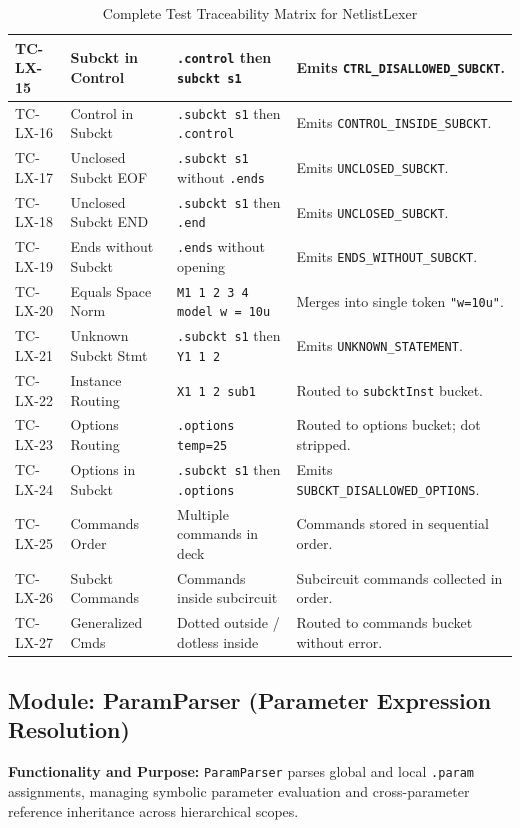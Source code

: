\begin{table}[H]
\begin{tabular}{|l|l|p{4.5cm}|p{4.5cm}|}
\hline
TC-LX-15 & Subckt in Control & \texttt{.control} then \texttt{subckt s1} & Emits \texttt{CTRL\_DISALLOWED\_SUBCKT}. \\
\hline
TC-LX-16 & Control in Subckt & \texttt{.subckt s1} then \texttt{.control} & Emits \texttt{CONTROL\_INSIDE\_SUBCKT}. \\
\hline
TC-LX-17 & Unclosed Subckt EOF & \texttt{.subckt s1} without \texttt{.ends} & Emits \texttt{UNCLOSED\_SUBCKT}. \\
\hline
TC-LX-18 & Unclosed Subckt END & \texttt{.subckt s1} then \texttt{.end} & Emits \texttt{UNCLOSED\_SUBCKT}. \\
\hline
TC-LX-19 & Ends without Subckt & \texttt{.ends} without opening & Emits \texttt{ENDS\_WITHOUT\_SUBCKT}. \\
\hline
TC-LX-20 & Equals Space Norm & \texttt{M1 1 2 3 4 model w = 10u} & Merges into single token \texttt{"w=10u"}. \\
\hline
TC-LX-21 & Unknown Subckt Stmt & \texttt{.subckt s1} then \texttt{Y1 1 2} & Emits \texttt{UNKNOWN\_STATEMENT}. \\
\hline
TC-LX-22 & Instance Routing & \texttt{X1 1 2 sub1} & Routed to \texttt{subcktInst} bucket. \\
\hline
TC-LX-23 & Options Routing & \texttt{.options temp=25} & Routed to options bucket; dot stripped. \\
\hline
TC-LX-24 & Options in Subckt & \texttt{.subckt s1} then \texttt{.options} & Emits \texttt{SUBCKT\_DISALLOWED\_OPTIONS}. \\
\hline
TC-LX-25 & Commands Order & Multiple commands in deck & Commands stored in sequential order. \\
\hline
TC-LX-26 & Subckt Commands & Commands inside subcircuit & Subcircuit commands collected in order. \\
\hline
TC-LX-27 & Generalized Cmds & Dotted outside / dotless inside & Routed to commands bucket without error. \\
\hline
\end{tabular}
\caption{Complete Test Traceability Matrix for NetlistLexer}
\end{table}


\subsection{Module: ParamParser (Parameter Expression Resolution)}

\textbf{Functionality and Purpose:} \texttt{ParamParser} parses global and local \texttt{.param} assignments, managing symbolic parameter evaluation and cross-parameter reference inheritance across hierarchical scopes.

